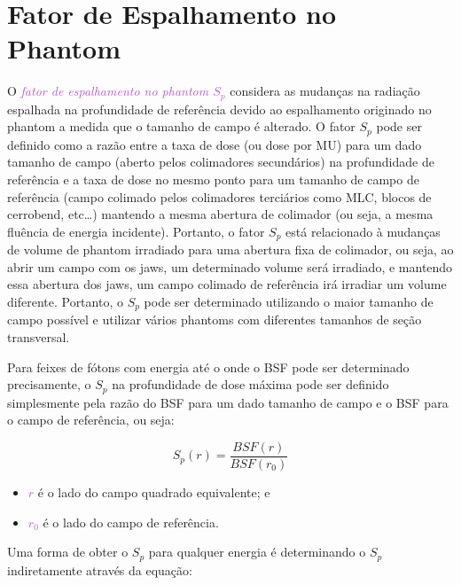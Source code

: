 \documentclass[11pt,a4paper]{article}
\newcounter{exemplo}
\begin{document}
    \section{Fator de Espalhamento no Phantom}

    O \textit{\textcolor{MediumOrchid}{fator de espalhamento no phantom $S_p$}} considera as mudanças na radiação espalhada na profundidade de referência devido ao espalhamento originado no phantom a medida que o tamanho de campo é alterado. O fator $S_p$ pode ser definido como a razão entre a taxa de dose (ou dose por MU) para um dado tamanho de campo (aberto pelos colimadores secundários) na profundidade de referência e a taxa de dose no mesmo ponto para um tamanho de campo de referência  (campo colimado pelos colimadores terciários como MLC, blocos de cerrobend, etc\dots) mantendo a mesma abertura de colimador (ou seja, a mesma fluência de energia incidente). Portanto, o fator $S_p$ está relacionado à mudanças de volume de phantom irradiado para uma abertura fixa de colimador, ou seja, ao abrir um campo com os jaws, um determinado volume será irradiado, e mantendo essa abertura dos jaws, um campo colimado de referência irá irradiar um volume diferente.  Portanto, o $S_p$ pode ser determinado utilizando o maior tamanho de campo possível e utilizar vários phantoms com diferentes tamanhos de seção transversal. 


    Para feixes de fótons com energia até o  onde o BSF pode ser determinado precisamente, o $S_p$ na profundidade de dose máxima pode ser definido simplesmente pela razão do BSF para um dado tamanho de campo e o BSF para o campo de referência, ou seja:

        \begin{equation}
            S_p(r) = \frac{BSF(r)}{BSF(r_0)}
            \label{eq:spBsf}
        \end{equation}

    \begin{exemplo}[onde:]
        \begin{itemize}
            \item \textcolor{MediumOrchid}{$r$} é o lado do campo quadrado equivalente; e
            \item \textcolor{MediumOrchid}{$r_0$} é o lado do campo de referência.
        \end{itemize}
    \end{exemplo}

    Uma forma de obter o $S_p$ para qualquer energia é determinando o $S_p$ indiretamente através da equação:
\end{document}
